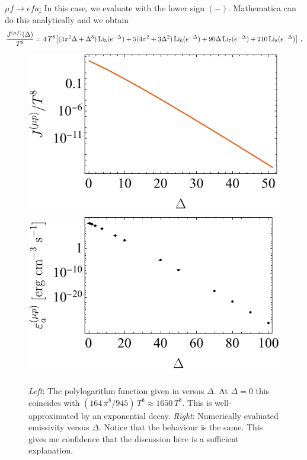 \underline{$\mu f \rightarrow e f a$:} \vspace{1ex} \newline
In this case, we evaluate  with the lower sign $(-)$.
Mathematica can do this analytically and we obtain
\begin{equation}
\begin{aligned}
    \label{eq:J-positive-delta-up}
    \frac{J^{(\mu f)}(\Delta)}{T^8} = 
    4 \, T^8 \big[
        (4 \pi^2 \Delta + \Delta^3) \, \mathrm{Li}_{5}(e^{-\Delta})
        + 5 (4\pi^2 + 3 \Delta^2) \, \mathrm{Li}_{6}(e^{-\Delta})
        + 90 \Delta \, \mathrm{Li}_{7}(e^{-\Delta})
        + 210 \, \mathrm{Li}_{8}(e^{-\Delta})
    \big]~,
\end{aligned}
\end{equation}

\begin{figure}[htbp]
    \centering
    \includegraphics[width=0.45\linewidth]{figs/polylogarithm-2.pdf}
    \includegraphics[width=0.45\linewidth]{figs/updata.pdf}
    \caption{
        \emph{Left}: The polylogarithm function given in  versus $\Delta$. At $\Delta=0$ this coincides with $(164 \, \pi^8 / 945) \, T^8 \approx 1650 \, T^8$. This is well-approximated by an exponential decay.
        \emph{Right}: Numerically evaluated emissivity versus $\Delta$.
        Notice that the behaviour is the same. This gives me confidence that the discussion here is a sufficient explanation.
    }
    \label{fig:positive-delta-up}
\end{figure}

